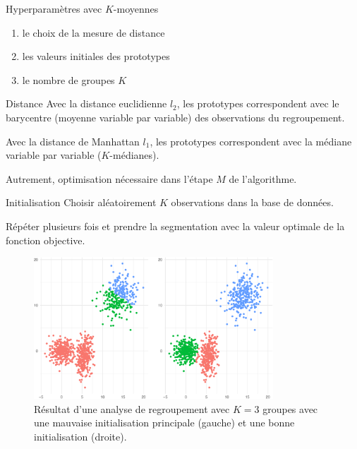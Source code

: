 \documentclass[
  ignorenonframetext,
]{beamer}
\providecommand{\tightlist}{%
  \setlength{\itemsep}{0pt}\setlength{\parskip}{0pt}}\usepackage{longtable,booktabs,array}
\begin{document}
\begin{frame}{Hyperparamètres avec \(K\)-moyennes}
\protect\hypertarget{hyperparamuxe8tres-avec-k-moyennes}{}
\begin{enumerate}
\tightlist
\item
  le choix de la mesure de distance
\item
  les valeurs initiales des prototypes
\item
  le nombre de groupes \(K\)
\end{enumerate}
\end{frame}

\begin{frame}{Distance}
\protect\hypertarget{distance}{}
Avec la distance euclidienne \(l_2\), les prototypes correspondent avec
le barycentre (moyenne variable par variable) des observations du
regroupement.

Avec la distance de Manhattan \(l_1\), les prototypes correspondent avec
la médiane variable par variable (\(K\)-médianes).

Autrement, optimisation nécessaire dans l'étape \(M\) de l'algorithme.
\end{frame}

\begin{frame}{Initialisation}
\protect\hypertarget{initialisation}{}
Choisir aléatoirement \(K\) observations dans la base de données.

Répéter plusieurs fois et prendre la segmentation avec la valeur
optimale de la fonction objective.

\begin{figure}

{\centering \includegraphics[width=0.8\textwidth,height=\textheight]{MATH60602-diapos11_files/figure-beamer/fig-kmoyenne-mauvais-1.pdf}

}

\caption{\label{fig-kmoyenne-mauvais}Résultat d'une analyse de
regroupement avec \(K=3\) groupes avec une mauvaise initialisation
principale (gauche) et une bonne initialisation (droite).}

\end{figure}
\end{frame}
\end{document}
